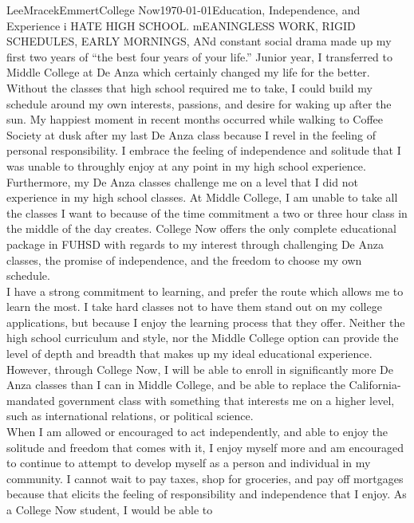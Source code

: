 \documentclass[a4paper]{article}
\begin{document}
\begin{mla}{Lee}{Mracek}{Emmert}{College Now}{\today}{Education, Independence,
    and Experience}
    i HATE HIGH SCHOOL. mEANINGLESS WORK, RIGID SCHEDULES, EARLY MORNINGS, ANd
    constant social drama made up my first two years of ``the best four years of
    your life.'' Junior year, I transferred to Middle College at De Anza which
    certainly changed my life for the better. Without the classes that high
    school required me to take, I could build my schedule around my own
    interests, passions, and desire for waking up after the sun. My happiest
    moment in recent months occurred while walking to Coffee Society at dusk
    after my last De Anza class because I revel in the feeling of personal
    responsibility. I embrace the feeling of independence and
    solitude that I was unable to throughly enjoy at any point in my high school experience. Furthermore, my De Anza classes challenge me on a level that I did not experience in my high school classes. At Middle College, I am unable to take all the classes I want to because of the time commitment a two or three hour class in the middle of the day creates. College Now offers the only complete educational package in FUHSD with regards to my interest through challenging De Anza classes, the promise of independence, and the freedom to choose my own schedule. \\
    I have a strong commitment to learning, and prefer the route which allows me
    to learn the most. I take hard classes not to have them stand out on my
    college applications, but because I enjoy the learning process that they
    offer. Neither the high school curriculum and style, nor the Middle College
    option can provide the level of depth and breadth that makes up my ideal educational experience. However, through College Now, I will be able to enroll in significantly more De Anza classes than I can in Middle College, and be able to replace the California-mandated government class with something that interests me on a higher level, such as international relations, or political science. \\
    When I am allowed or encouraged to act independently, and able to enjoy the
    solitude and freedom that comes with it, I enjoy myself more and am
    encouraged to continue to attempt to develop myself as a person and
    individual in my community. I cannot wait to pay taxes, shop for groceries,
    and pay off mortgages because that elicits the feeling of responsibility and
    independence that I enjoy. As a College Now student, I would be able to

\end{mla}
\end{document}
